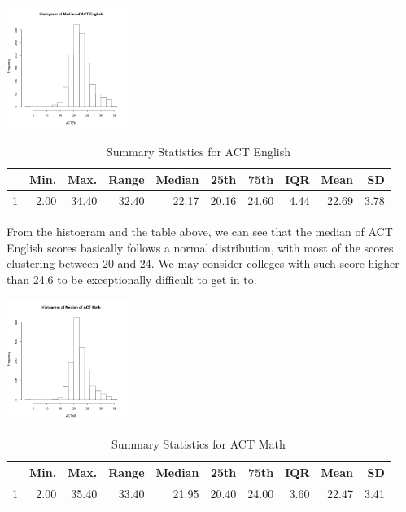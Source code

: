 \documentclass{article}\usepackage[]{graphicx}\usepackage[]{color}
\begin{document}
{\centering \includegraphics[width=150px]{../images/histogram-ACTENMedian} 

}


\begin{table}[ht]
\centering
\begin{tabular}{rrrrrrrrrr}
  \hline
 & Min. & Max. & Range & Median & 25th & 75th & IQR & Mean & SD \\ 
  \hline
1 & 2.00 & 34.40 & 32.40 & 22.17 & 20.16 & 24.60 & 4.44 & 22.69 & 3.78 \\ 
   \hline
\end{tabular}
\caption{Summary Statistics for ACT English} 
\end{table}


From the histogram and the table above, we can see that the median of ACT English scores basically follows a normal distribution, with most of the scores clustering between 20 and 24. We may consider colleges with such score higher than 24.6 to be exceptionally difficult to get in to.



{\centering \includegraphics[width=150px]{../images/histogram-ACTMTMedian} 

}


\begin{table}[ht]
\centering
\begin{tabular}{rrrrrrrrrr}
  \hline
 & Min. & Max. & Range & Median & 25th & 75th & IQR & Mean & SD \\ 
  \hline
1 & 2.00 & 35.40 & 33.40 & 21.95 & 20.40 & 24.00 & 3.60 & 22.47 & 3.41 \\ 
   \hline
\end{tabular}
\caption{Summary Statistics for ACT Math} 
\end{table}
\end{document}
